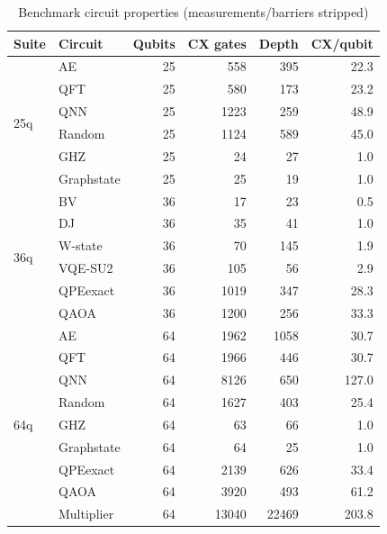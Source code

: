 \begin{table}[t]
\centering
\caption{Benchmark circuit properties (measurements/barriers stripped)}
\label{tab:circuits}
\setlength{\tabcolsep}{5pt}
\begin{tabular}{@{}llrrrr@{}}
\toprule
Suite & Circuit    & Qubits & CX gates & Depth & CX/qubit \\
\midrule
\multirow{6}{*}{25q}
 & AE         & 25 &  558 & 395 & 22.3 \\
 & QFT        & 25 &  580 & 173 & 23.2 \\
 & QNN        & 25 & 1223 & 259 & 48.9 \\
 & Random     & 25 & 1124 & 589 & 45.0 \\
 & GHZ        & 25 &   24 &  27 &  1.0 \\
 & Graphstate & 25 &   25 &  19 &  1.0 \\
\midrule
\multirow{6}{*}{36q}
 & BV         & 36 &   17 &  23 &  0.5 \\
 & DJ         & 36 &   35 &  41 &  1.0 \\
 & W-state    & 36 &   70 & 145 &  1.9 \\
 & VQE-SU2   & 36 &  105 &  56 &  2.9 \\
 & QPEexact   & 36 & 1019 & 347 & 28.3 \\
 & QAOA       & 36 & 1200 & 256 & 33.3 \\
\midrule
\multirow{9}{*}{64q}
 & AE         & 64 & 1962 & 1058 & 30.7 \\
 & QFT        & 64 & 1966 &  446 & 30.7 \\
 & QNN        & 64 & 8126 &  650 & 127.0 \\
 & Random     & 64 & 1627 &  403 & 25.4 \\
 & GHZ        & 64 &   63 &   66 &  1.0 \\
 & Graphstate & 64 &   64 &   25 &  1.0 \\
 & QPEexact   & 64 & 2139 & 626 & 33.4 \\
 & QAOA       & 64 & 3920 & 493 & 61.2 \\
 & Multiplier & 64 & 13040 & 22469 & 203.8 \\
\bottomrule
\end{tabular}
\end{table}

